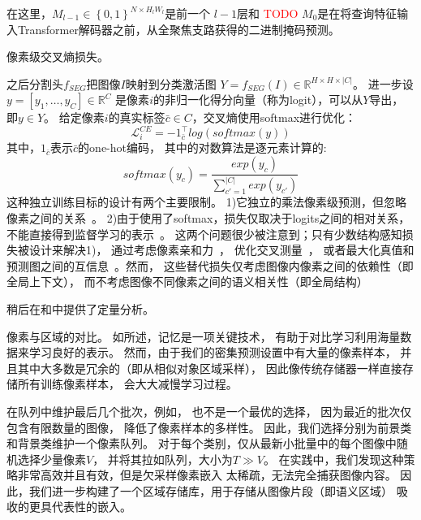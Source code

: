 % 
% 
在这里，$M_{l-1} \in \left \{  0,1\right \} ^{N \times H_{l}W_{l}} $是前一个
$l-1$层和
\textcolor{red}{TODO}
$M_{0}$是在将查询特征输入Transformer解码器之前，从全聚焦支路获得的二进制掩码预测。
%
%
%
%
\par 
%
%
%












像素级交叉熵损失。



之后分割头$f_{SEG}$把图像$I$映射到分类激活图
$Y=f_{SEG}(I) \in \mathbb{R}^{H\times H \times |C|}$。
进一步设$y=\left [ y_{1},\dots, y_{C} \right ] \in\mathbb{R}^{C}$
是像素$i$的非归一化得分向量（称为logit），可以从$Y$导出，
即$y \in Y$。
给定像素$i$的真实标签$\bar{c} \in C$，交叉熵使用softmax进行优化：
\begin{equation}
	\mathcal{L}_{i}^{CE}=-1_{\bar{c}}^{\top } log(softmax(y))
	\label{chpt4:eq:loss_softmax}
\end{equation}
% 
% 
% 
% 
其中，$1_{\bar{c}}$表示$\bar{c}$的one-hot编码，
其中的对数算法是逐元素计算的:
\begin{equation}
	softmax(y_{c}) = \frac
	{exp(y_{c})}
	{ 
		\sum_{{c}'=1 }^{|C|} 
		exp(y_{{c}'}) 
	} 
\end{equation}
% 
% 
% 
% 
这种独立训练目标的设计有两个主要限制。
1)它独立的乘法像素级预测，但忽略像素之间的关系~\cite{zhao2019region}。
2)由于使用了softmax，损失仅取决于logits之间的相对关系，
不能直接得到监督学习的表示~\cite{pang2019rethinking}。
这两个问题很少被注意到；只有少数结构感知损失被设计来解决1)，
通过考虑像素亲和力~\cite{ke2018adaptive}，
优化交叉测量~\cite{berman2018lovasz}，
或者最大化真值和预测图之间的互信息~\cite{zhao2019region}。然而，
这些替代损失仅考虑图像内像素之间的依赖性（即全局上下文），
而不考虑图像不同像素之间的语义相关性（即全局结构）
\par
% 
% 
% 
% 

\par
% 
% 


稍后在\todo 和\todo 中提供了定量分析。


像素与区域的对比。
如\todo 所述，记忆是一项关键技术，
有助于对比学习利用海量数据来学习良好的表示。
然而，由于我们的密集预测设置中有大量的像素样本，
并且其中大多数是冗余的（即从相似对象区域采样），
因此像传统存储器一样直接存储所有训练像素样本\todo ，
会大大减慢学习过程。
\par
% 
% 
% 
% 
在队列中维护最后几个批次，例如\todo，
也不是一个最优的选择，
因为最近的批次仅包含有限数量的图像，
降低了像素样本的多样性。
因此，我们选择分别为前景类和背景类维护一个像素队列。
对于每个类别，仅从最新小批量中的每个图像中随机选择少量像素$V$，
并将其拉如队列，大小为$T \gg  V$。
% 
% 
% 
% 
在实践中，我们发现这种策略非常高效并且有效，但是欠采样像素嵌入
太稀疏，无法完全捕获图像内容。
因此，我们进一步构建了一个区域存储库，用于存储从图像片段（即语义区域）
吸收的更具代表性的嵌入。



